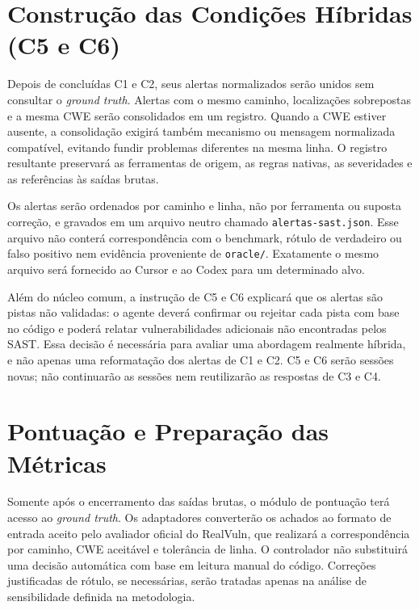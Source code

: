 \section{Construção das Condições Híbridas (C5 e C6)}\label{sec:condicao-hibrida-desenvolvimento}

Depois de concluídas C1 e C2, seus alertas normalizados serão unidos sem consultar o \textit{ground truth}. Alertas com o mesmo caminho, localizações sobrepostas e a mesma CWE serão consolidados em um registro. Quando a CWE estiver ausente, a consolidação exigirá também mecanismo ou mensagem normalizada compatível, evitando fundir problemas diferentes na mesma linha. O registro resultante preservará as ferramentas de origem, as regras nativas, as severidades e as referências às saídas brutas.

Os alertas serão ordenados por caminho e linha, não por ferramenta ou suposta correção, e gravados em um arquivo neutro chamado \texttt{alertas-sast.json}. Esse arquivo não conterá correspondência com o benchmark, rótulo de verdadeiro ou falso positivo nem evidência proveniente de \texttt{oracle/}. Exatamente o mesmo arquivo será fornecido ao Cursor e ao Codex para um determinado alvo.

Além do núcleo comum, a instrução de C5 e C6 explicará que os alertas são pistas não validadas: o agente deverá confirmar ou rejeitar cada pista com base no código e poderá relatar vulnerabilidades adicionais não encontradas pelos SAST. Essa decisão é necessária para avaliar uma abordagem realmente híbrida, e não apenas uma reformatação dos alertas de C1 e C2. C5 e C6 serão sessões novas; não continuarão as sessões nem reutilizarão as respostas de C3 e C4.

\section{Pontuação e Preparação das Métricas}\label{sec:adjudicacao-desenvolvimento}

Somente após o encerramento das saídas brutas, o módulo de pontuação terá acesso ao \textit{ground truth}. Os adaptadores converterão os achados ao formato de entrada aceito pelo avaliador oficial do RealVuln, que realizará a correspondência por caminho, CWE aceitável e tolerância de linha. O controlador não substituirá uma decisão automática com base em leitura manual do código. Correções justificadas de rótulo, se necessárias, serão tratadas apenas na análise de sensibilidade definida na metodologia.

